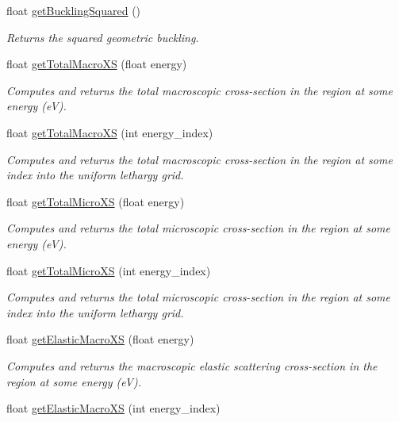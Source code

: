 \begin{DoxyCompactItemize}
float \hyperlink{classRegion_a032f38b6fbd2bac296aff6367a273456}{get\-Buckling\-Squared} ()
\begin{DoxyCompactList}\small\item\em Returns the squared geometric buckling. \end{DoxyCompactList}\item 
float \hyperlink{classRegion_a44ae74637def12405bf79097854ce376}{get\-Total\-Macro\-X\-S} (float energy)
\begin{DoxyCompactList}\small\item\em Computes and returns the total macroscopic cross-\/section in the region at some energy (e\-V). \end{DoxyCompactList}\item 
float \hyperlink{classRegion_a1e0b264433131ab0e902d9fc2fee7477}{get\-Total\-Macro\-X\-S} (int energy\-\_\-index)
\begin{DoxyCompactList}\small\item\em Computes and returns the total macroscopic cross-\/section in the region at some index into the uniform lethargy grid. \end{DoxyCompactList}\item 
float \hyperlink{classRegion_a0b51ec68621a1861e9ed5e13e5824b3c}{get\-Total\-Micro\-X\-S} (float energy)
\begin{DoxyCompactList}\small\item\em Computes and returns the total microscopic cross-\/section in the region at some energy (e\-V). \end{DoxyCompactList}\item 
float \hyperlink{classRegion_acc45e5ac87b7892b02df8624aafbb5b7}{get\-Total\-Micro\-X\-S} (int energy\-\_\-index)
\begin{DoxyCompactList}\small\item\em Computes and returns the total microscopic cross-\/section in the region at some index into the uniform lethargy grid. \end{DoxyCompactList}\item 
float \hyperlink{classRegion_a90a6edf5bbe9d55ccb6c326af430dade}{get\-Elastic\-Macro\-X\-S} (float energy)
\begin{DoxyCompactList}\small\item\em Computes and returns the macroscopic elastic scattering cross-\/section in the region at some energy (e\-V). \end{DoxyCompactList}\item 
float \hyperlink{classRegion_a886c0cb8cefaa51c6b9166c7c7eb017f}{get\-Elastic\-Macro\-X\-S} (int energy\-\_\-index)

\end{DoxyCompactItemize}
